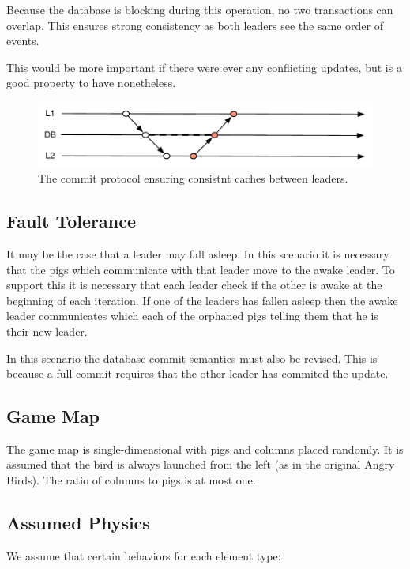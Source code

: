 \documentclass[]{article}
\makeatletter
\def\maxwidth{\ifdim\Gin@nat@width>\linewidth\linewidth
\else\Gin@nat@width\fi}
\let\Oldincludegraphics\includegraphics
\renewcommand{\includegraphics}[1]{\Oldincludegraphics[width=\maxwidth]{#1}}
\makeatother
\begin{document}
Because the database is blocking during this operation, no two transactions can
overlap. This ensures strong consistency as both leaders see the same order of
events. 

This would be more important if there were ever any conflicting updates, but is
a good property to have nonetheless.

\begin{figure}
    \centering
    \includegraphics{figs/commit.pdf}
    \caption{The commit protocol ensuring consistnt caches between leaders.\label{commit}}
\end{figure}


\subsection{Fault Tolerance}

It may be the case that a leader may fall asleep. In this scenario it is
necessary that the pigs which communicate with that leader move to the awake
leader. To support this it is necessary that each leader check if the other is
awake at the beginning of each iteration. If one of the leaders has fallen
asleep then the awake leader communicates which each of the orphaned pigs
telling them that he is their new leader.

In this scenario the database commit semantics must also be revised.  This is
because a full commit requires that the other leader has commited the update.

\subsection{Game Map}

The game map is single-dimensional with pigs and columns placed
randomly. It is assumed that the bird is always launched from the left
(as in the original Angry Birds). The ratio of columns to pigs is at
most one.

\subsection{Assumed Physics}

We assume that certain behaviors for each element type:
\end{document}
